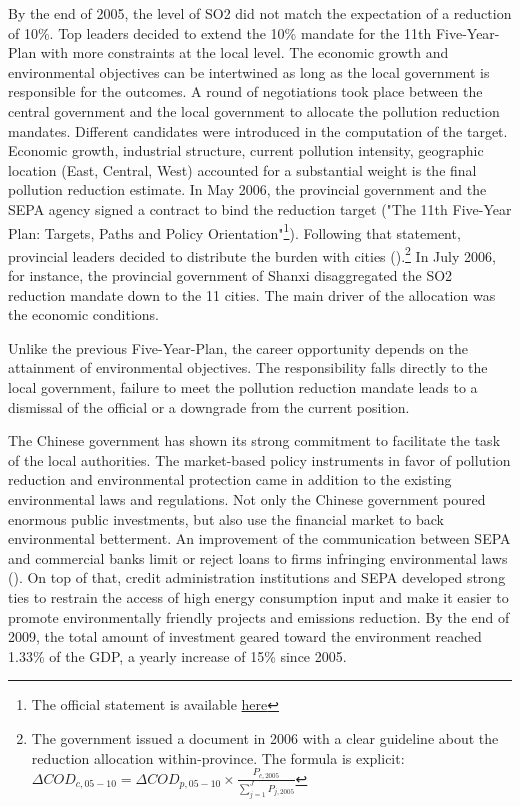 \documentclass[12pt]{article}
\begin{document}
By the end of 2005, the level of SO2 did not match the expectation of a reduction of 10\%. Top leaders decided to extend the 10\% mandate for the 11th Five-Year-Plan with more constraints at the local level. The economic growth and environmental objectives can be intertwined as long as the local government is responsible for the outcomes. A round of negotiations took place between the central government and the local government to allocate the pollution reduction mandates. Different candidates were introduced in the computation of the target. Economic growth, industrial structure, current pollution intensity, geographic location (East, Central, West) accounted for a substantial weight is the final pollution reduction estimate. In May 2006, the provincial government and the SEPA agency signed a contract to bind the reduction target ("The 11th Five-Year Plan: Targets, Paths and Policy Orientation"\footnote{The official statement is available \href{http://en.ndrc.gov.cn/newsrelease/200603/t20060323_63813.html}{here}}). Following that statement, provincial leaders decided to distribute the burden with cities (\cite{Liu2017-ib}).\footnote{The government issued a document in 2006 with a clear guideline about the reduction allocation within-province. The formula is explicit: $\Delta C O D_{c, 05-10}=\Delta C O D_{p, 05-10} \times \frac{P_{c, 2005}}{\sum_{j=1}^{J} P_{j, 2005}}$} In July 2006, for instance, the provincial government of Shanxi disaggregated the SO2 reduction mandate down to the 11 cities. The main driver of the allocation was the economic conditions.

Unlike the previous Five-Year-Plan, the career opportunity depends on the attainment of environmental objectives. The responsibility falls directly to the local government, failure to meet the pollution reduction mandate leads to a dismissal of the official or a downgrade from the current position.

The Chinese government has shown its strong commitment to facilitate the task of the local authorities. The market-based policy instruments in favor of pollution reduction and environmental protection came in addition to the existing environmental laws and regulations. Not only the Chinese government poured enormous public investments, but also use the financial market to back environmental betterment. An improvement of the communication between SEPA and commercial banks limit or reject loans to firms infringing environmental laws (\cite{Oecd2008-pi}). On top of that, credit administration institutions and SEPA developed strong ties to restrain the access of high energy consumption input and make it easier to promote environmentally friendly projects and emissions reduction. By the end of 2009, the total amount of investment geared toward the environment reached 1.33\% of the GDP, a yearly increase of 15\% since 2005. 
\end{document}
